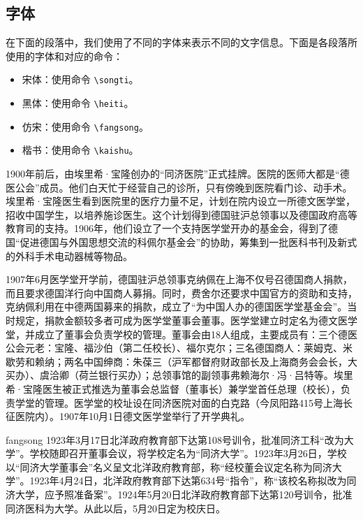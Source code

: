 \subsection{字体}

在下面的段落中，我们使用了不同的字体来表示不同的文字信息。下面是各段落所使用的字体和对应的命令：

\begin{itemize}
\item {\songti 宋体}：使用命令 \texttt{\textbackslash songti}。
\item {\heiti 黑体}：使用命令 \texttt{\textbackslash heiti}。
\item {\fangsong 仿宋}：使用命令 \texttt{\textbackslash fangsong}。
\item {\kaishu 楷书}：使用命令 \texttt{\textbackslash kaishu}。
\end{itemize}

{\songti 

1900年前后，由埃里希·宝隆创办的“同济医院”正式挂牌。医院的医师大都是“德医公会”成员。他们白天忙于经营自己的诊所，只有傍晚到医院看门诊、动手术。埃里希·宝隆医生看到医院里的医疗力量不足，计划在院内设立一所德文医学堂，招收中国学生，以培养施诊医生。这个计划得到德国驻沪总领事以及德国政府高等教育司的支持。1906年，他们设立了一个支持医学堂开办的基金会，得到了德国“促进德国与外国思想交流的科佩尔基金会”的协助，筹集到一批医科书刊及新式的外科手术电动器械等物品。}

{\heiti 1907年6月医学堂开学前，德国驻沪总领事克纳佩在上海不仅号召德国商人捐款，而且要求德国洋行向中国商人募捐。同时，费舍尔还要求中国官方的资助和支持，克纳佩利用在中德两国募来的捐款，成立了“为中国人办的德国医学堂基金会”。当时规定，捐款金额较多者可成为医学堂董事会董事。医学堂建立时定名为德文医学堂，并成立了董事会负责学校的管理。董事会由18人组成，主要成员有：三个德医公会元老：宝隆、福沙伯（第二任校长）、福尔克尔；三名德国商人：莱姆克、米歇劳和赖纳；两名中国绅商：朱葆三（沪军都督府财政部长及上海商务会会长，大买办）、虞洽卿（荷兰银行买办）；总领事馆的副领事弗赖海尔·冯·吕特等。埃里希·宝隆医生被正式推选为董事会总监督（董事长）兼学堂首任总理（校长），负责学堂的管理。医学堂的校址设在同济医院对面的白克路（今凤阳路415号上海长征医院内）。1907年10月1日德文医学堂举行了开学典礼。}

{\ifcsname fangsong\endcsname\fangsong\else[无 \cs{fangsong} 字体。]\fi 
1923年3月17日北洋政府教育部下达第108号训令，批准同济工科“改为大学”。学校随即召开董事会议，将学校定名为“同济大学”。1923年3月26日，学校以“同济大学董事会”名义呈文北洋政府教育部，称“经校董会议定名称为同济大学”。1923年4月24日，北洋政府教育部下达第634号“指令”，称“该校名称拟改为同济大学，应予照准备案”。1924年5月20日北洋政府教育部下达第120号训令，批准同济医科为大学。从此以后，5月20日定为校庆日。}

